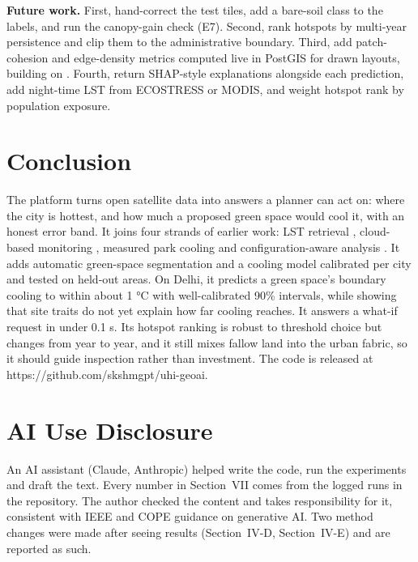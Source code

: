 \documentclass[conference]{IEEEtran}
\begin{document}
\textbf{Future work.} First, hand-correct the test tiles, add a
bare-soil class to the labels, and run the canopy-gain check (E7).
Second, rank hotspots by multi-year persistence and clip them to the
administrative boundary. Third, add patch-cohesion and edge-density
metrics computed live in PostGIS for drawn layouts, building on
\cite{b4}. Fourth, return SHAP-style explanations alongside each
prediction, add night-time LST from ECOSTRESS or MODIS, and weight
hotspot rank by population exposure.

\section{Conclusion}\label{conclusion}

The platform turns open satellite data into answers a planner can act
on: where the city is hottest, and how much a proposed green space would
cool it, with an honest error band. It joins four strands of earlier
work: LST retrieval \cite{b1}, cloud-based monitoring \cite{b2},
measured park cooling \cite{b3} and configuration-aware analysis
\cite{b4}. It adds automatic green-space segmentation and a cooling
model calibrated per city and tested on held-out areas. On Delhi, it
predicts a green space's boundary cooling to within about 1 °C with
well-calibrated 90\% intervals, while showing that site traits do not
yet explain how far cooling reaches. It answers a what-if request in
under 0.1 s. Its hotspot ranking is robust to threshold choice but
changes from year to year, and it still mixes fallow land into the urban
fabric, so it should guide inspection rather than investment. The code
is released at https://github.com/skshmgpt/uhi-geoai.

\section*{AI Use Disclosure}
An AI assistant (Claude, Anthropic) helped write the code, run the
experiments and draft the text. Every number in Section~VII comes from
the logged runs in the repository. The author checked the content and
takes responsibility for it, consistent with IEEE and COPE guidance on
generative AI. Two method changes were made after seeing results
(Section~IV-D, Section~IV-E) and are reported as such.
\end{document}
